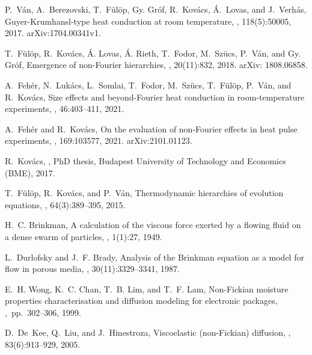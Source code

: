 \documentclass[sn-mathphys]{sn-jnl}%
\theoremstyle{thmstyleone}%
\theoremstyle{thmstyletwo}%
\theoremstyle{thmstylethree}%
\begin{document}
\begin{thebibliography}{9}
	P.~V{\'a}n, A.~Berezovski, T.~F{\"u}l{\"o}p, Gy. Gr{\'o}f, R.~Kov{\'a}cs,
	{\'A}.~Lovas, and J.~Verh{\'a}s,
	\newblock Guyer-{K}rumhansl-type heat conduction at room temperature,
	, 118(5):50005, 2017.
	\newblock arXiv:1704.00341v1.
	
	T.~F\"ul\"op, R.~Kov\'acs, \'A. Lovas, \'A. Rieth, T.~Fodor, M.~Sz\"ucs, P.~V\'an, and Gy. Gr{\'o}f,
	\newblock Emergence of non-{F}ourier hierarchies,
	, 20(11):832, 2018.
	\newblock arXiv: 1808.06858.
	
	A.~Fehér, N.~Lukács, L.~Somlai, T.~Fodor, M.~Szücs, T.~Fülöp, P.~Ván, and
	R.~Kovács,
	\newblock Size effects and beyond-{F}ourier heat conduction in room-temperature
	experiments,
	, 46:403--411, 2021.
	
	A.~Fehér and R.~Kovács,
	\newblock On the evaluation of non-{F}ourier effects in heat pulse experiments,
	, 169:103577, 2021.
	\newblock arXiv:2101.01123.
	
	R.~Kov\'acs,
	,
	\newblock PhD thesis, Budapest University of Technology and Economics (BME),
	2017.
	
	T.~F\"ul\"op, R.~Kov\'acs, and P.~V\'an,
	\newblock Thermodynamic hierarchies of evolution equations,
	,
	64(3):389--395, 2015.
	
	H.~C. Brinkman,
	\newblock A calculation of the viscous force exerted by a flowing fluid on a
	dense swarm of particles,
	, 1(1):27, 1949.
	
	L.~Durlofsky and J.~F. Brady,
	\newblock Analysis of the {B}rinkman equation as a model for flow in porous
	media,
	, 30(11):3329--3341, 1987.
	
	E.~H. Wong, K.~C. Chan, T.~B. Lim, and T.~F. Lam,
	\newblock Non-{F}ickian moisture properties characterisation and diffusion
	modeling for electronic packages,
	, pp. 302--306, 1999.
	
	D.~De~Kee, Q.~Liu, and J.~Hinestroza,
	\newblock Viscoelastic (non-{F}ickian) diffusion,
	, 83(6):913--929,
	2005.
	

\end{thebibliography}
\end{document}
